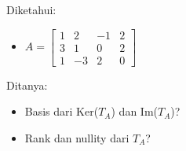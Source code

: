 \documentclass[12pt, a4paper]{scrartcl}
\begin{document}
\begin{enumerate}
\begin{enumerate}
            Diketahui:
            \begin{itemize}
                \item[] $A=\begin{bmatrix}
                    1 & 2 & -1 & 2\\
                    3 & 1 & 0 & 2 \\
                    1 & -3 & 2 & 0
                \end{bmatrix}$
            \end{itemize}

            Ditanya:
            \begin{itemize}
                \item Basis dari Ker($T_A$) dan Im($T_A$)?
                \item Rank dan nullity dari $T_A$?
            \end{itemize}
            

\end{enumerate}
\end{enumerate}
\end{document}
